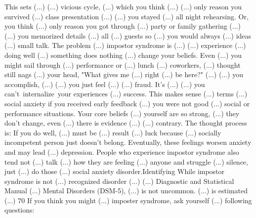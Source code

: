 \documentclass[14pt,a4paper]{extarticle}
\begin{document}
This sets (...) (...) vicious cycle, (...) which you think (...) (...) only reason you survived (...) class presentation (...) (...) you stayed (...) all night rehearsing. Or, you think (...) only reason you got through (...) party or family gathering (...) (...) you memorized details (...) all (...) guests so (...) you would always (...) ideas (...) small talk.
\newline\newline 
The problem (...) impostor syndrome is (...) (...) experience (...) doing well (...) something does nothing (...) change your beliefs. Even (...) you might sail through (...) performance or (...) lunch (...) coworkers, (...) thought still nags (...) your head, "What gives me (...) right (...) be here?" (...) (...) you accomplish, (...) (...) you just feel (...) (...) fraud. It's (...) (...) you can't internalize your experiences (...) success.
\newline\newline 
This makes sense (...) terms (...) social anxiety if you received early feedback (...) you were not good (...) social or performance situations. Your core beliefs (...) yourself are so strong, (...) they don't change, even (...) there is evidence (...) (...) contrary.
\newline\newline 
The thought process is: If you do well, (...) must be (...) result (...) luck because (...) socially incompetent person just doesn't belong.
\newline\newline 
Eventually, these feelings worsen anxiety and may lead (...) depression. People who experience impostor syndrome also tend not (...) talk (...) how they are feeling (...) anyone and struggle (...) silence, just (...) do those (...) social anxiety disorder.\newline\newline  Identifying \newline\newline 
While impostor syndrome is not (...) recognized disorder (...) (...) Diagnostic and Statistical Manual (...) Mental Disorders (DSM-5), (...) is not uncommon. (...) is estimated (...) 70%
\newline\newline 
If you think you might (...) imposter syndrome, ask yourself (...) following questions:
\newline\newline 
\end{document}
